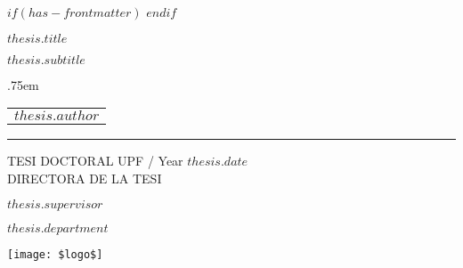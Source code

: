 $if(has-frontmatter)$
\frontmatter
$endif$


\begin{titlepage}
  \begin{spacing}{1}
    \null\vfil
    \begin{flushleft}%
      {\LARGE \sffamily $thesis.title$ \par}%
      \vspace*{1cm}
      {\Large \sffamily $thesis.subtitle$ \par}%
      \vskip 1cm%
      {\large \lineskip .75em \begin{tabular}[t]{c} {\Huge $thesis.author$} \end{tabular}\par}
      \rule{\linewidth}{1mm} \par
      \vskip 1cm%
      {\large TESI DOCTORAL UPF / Year $thesis.date$}\\[2cm]
      {\normalsize DIRECTORA DE LA TESI}\par
      {\large $thesis.supervisor$}\par
      {\large $thesis.department$} \par
      \vspace{2cm}
     \centering
      \texttt{[image: \$logo\$]}
     \end{flushleft}\par
     \afterpage{\blankpage}
    \end{spacing}
\end{titlepage}
\newpage


